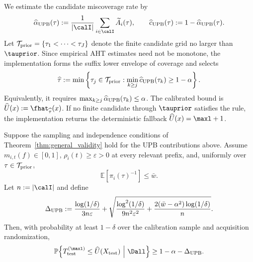 We estimate the candidate miscoverage rate by
\begin{equation}
    \widehat\alpha_{\rm UPB}(\tau)
    :=\frac{1}{|\calI|}\sum_{i\in\calI}\widetilde A_i(\tau),
    \qquad
    \widehat c_{\rm UPB}(\tau):=1-\widehat\alpha_{\rm UPB}(\tau).
    \label{eq:upb_miscoverage_estimator}
\end{equation}
Let $\mathcal T_{\rm prior}=\{\tau_1<\cdots<\tau_J\}$ denote the finite
candidate grid no larger than $\tauprior$. Since empirical AHT estimates need
not be monotone, the implementation forms the suffix lower envelope of
coverage and selects
\begin{equation}
    \widehat\tau
    :=\min\left\{
        \tau_j\in\mathcal T_{\rm prior}:
        \min_{k\geq j}\widehat c_{\rm UPB}(\tau_k)\geq1-\alpha
    \right\}.
    \label{eq:upb_calibrated_tau}
\end{equation}
Equivalently, it requires
$\max_{k\geq j}\widehat\alpha_{\rm UPB}(\tau_k)\leq\alpha$.
The calibrated bound is $\widehat U(x):=\fhat_{\widehat\tau}(x)$. If no
finite candidate through $\tauprior$ satisfies the rule, the implementation
returns the deterministic fallback $\widehat U(x)=\maxl+1$.

\begin{theorem}
\label{thm:upb_coverage}
Suppose the sampling and independence conditions of
Theorem~\ref{thm:general_validity} hold for the UPB contributions above.
Assume $m_{i,t}(f)\in[0,1]$, $\rho_i(t)\geq\varepsilon>0$ at every relevant
prefix, and, uniformly over $\tau\in\mathcal T_{\rm prior}$,
\begin{equation}
    \mathbb E\!\left[\pi_i(\tau)^{-1}\right]\leq\bar w.
\end{equation}
Let $n:=|\calI|$ and define
\begin{equation}
    \Delta_{\rm UPB}
    :=\frac{\log(1/\delta)}{3n\varepsilon}
      +\sqrt{
        \frac{\log^2(1/\delta)}{9n^2\varepsilon^2}
        +\frac{2(\bar w-\alpha^2)\log(1/\delta)}{n}}
    .
    \label{eq:upb_coverage_slack}
\end{equation}
Then, with probability at least $1-\delta$ over the calibration sample and
acquisition randomization,
\begin{equation}
    \mathbb P\!\left\{
      T_{\rm test}^{(\maxl)}\leq\widehat U(X_{\rm test})
      \ \middle|\ \Dall
    \right\}
    \geq1-\alpha-\Delta_{\rm UPB}.
    \label{eq:upb_coverage_result}
\end{equation}
\end{theorem}

